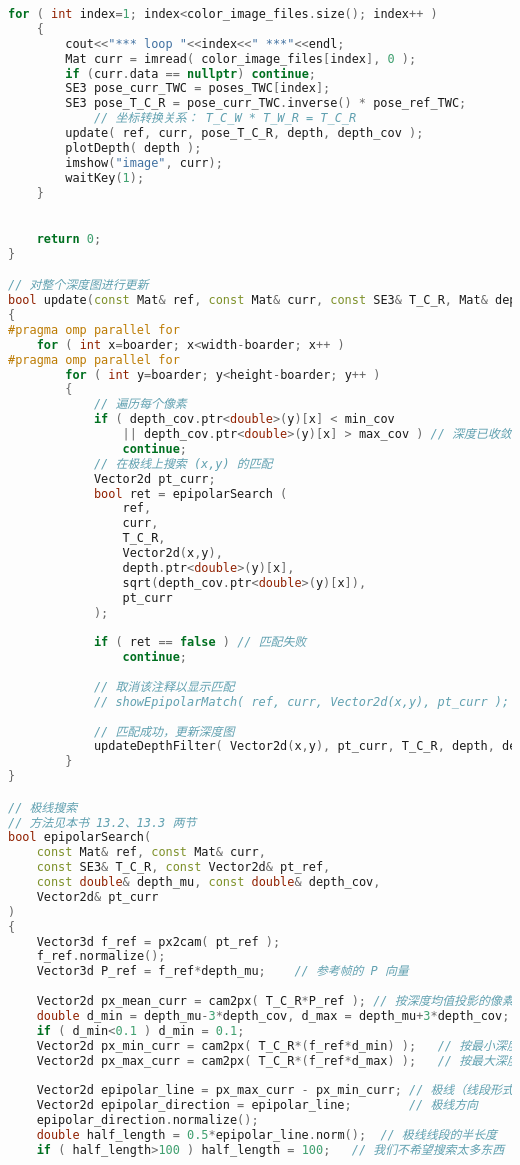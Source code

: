 \begin{lstlisting}[language=c++,caption=slambook/ch13/dense\_monocular/dense\_mapping.cpp（片段）]
	for ( int index=1; index<color_image_files.size(); index++ )
	{
		cout<<"*** loop "<<index<<" ***"<<endl;
		Mat curr = imread( color_image_files[index], 0 );       
		if (curr.data == nullptr) continue;
		SE3 pose_curr_TWC = poses_TWC[index];
		SE3 pose_T_C_R = pose_curr_TWC.inverse() * pose_ref_TWC;
		    // 坐标转换关系： T_C_W * T_W_R = T_C_R 
		update( ref, curr, pose_T_C_R, depth, depth_cov );
		plotDepth( depth );
		imshow("image", curr);
		waitKey(1);
	}

	
	return 0;
}

// 对整个深度图进行更新
bool update(const Mat& ref, const Mat& curr, const SE3& T_C_R, Mat& depth, Mat& depth_cov )
{
#pragma omp parallel for
	for ( int x=boarder; x<width-boarder; x++ )
#pragma omp parallel for
		for ( int y=boarder; y<height-boarder; y++ )
		{
			// 遍历每个像素
			if ( depth_cov.ptr<double>(y)[x] < min_cov 
				|| depth_cov.ptr<double>(y)[x] > max_cov ) // 深度已收敛或发散
				continue;
			// 在极线上搜索 (x,y) 的匹配 
			Vector2d pt_curr; 
			bool ret = epipolarSearch ( 
				ref, 
				curr, 
				T_C_R, 
				Vector2d(x,y), 
				depth.ptr<double>(y)[x], 
				sqrt(depth_cov.ptr<double>(y)[x]),
				pt_curr
			);
			
			if ( ret == false ) // 匹配失败
				continue; 
			
			// 取消该注释以显示匹配
			// showEpipolarMatch( ref, curr, Vector2d(x,y), pt_curr );
			
			// 匹配成功，更新深度图 
			updateDepthFilter( Vector2d(x,y), pt_curr, T_C_R, depth, depth_cov );
		}
}

// 极线搜索
// 方法见本书 13.2、13.3 两节
bool epipolarSearch(
	const Mat& ref, const Mat& curr, 
	const SE3& T_C_R, const Vector2d& pt_ref, 
	const double& depth_mu, const double& depth_cov, 
	Vector2d& pt_curr 
)
{
	Vector3d f_ref = px2cam( pt_ref );
	f_ref.normalize();
	Vector3d P_ref = f_ref*depth_mu;	// 参考帧的 P 向量
	
	Vector2d px_mean_curr = cam2px( T_C_R*P_ref ); // 按深度均值投影的像素
	double d_min = depth_mu-3*depth_cov, d_max = depth_mu+3*depth_cov;
	if ( d_min<0.1 ) d_min = 0.1;
	Vector2d px_min_curr = cam2px( T_C_R*(f_ref*d_min) );	// 按最小深度投影的像素
	Vector2d px_max_curr = cam2px( T_C_R*(f_ref*d_max) );	// 按最大深度投影的像素
	
	Vector2d epipolar_line = px_max_curr - px_min_curr;	// 极线（线段形式）
	Vector2d epipolar_direction = epipolar_line;		// 极线方向 
	epipolar_direction.normalize();
	double half_length = 0.5*epipolar_line.norm();	// 极线线段的半长度
	if ( half_length>100 ) half_length = 100;   // 我们不希望搜索太多东西 
	

\end{lstlisting}
